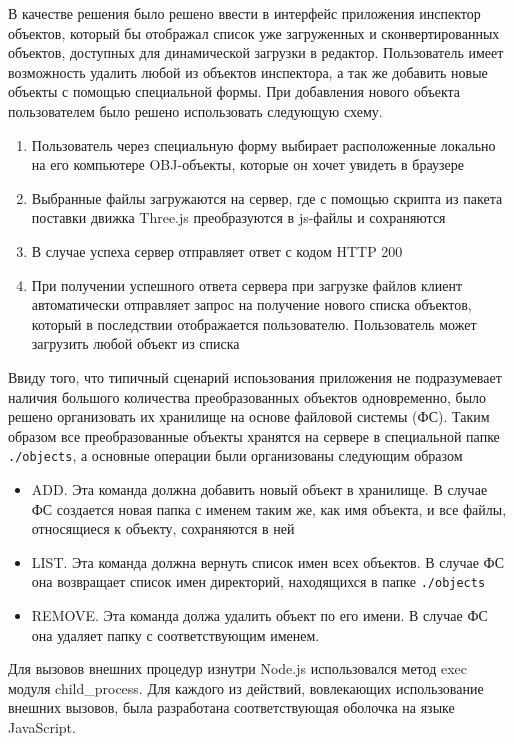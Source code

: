 \documentclass[12pt, a4paper]{article}
\begin{document}
В качестве решения было решено ввести в интерфейс приложения инспектор объектов,
который бы отображал список уже загруженных и сконвертированных объектов,
доступных для динамической загрузки в редактор. Пользователь имеет возможность
удалить любой из объектов инспектора, а так же добавить новые объекты с помощью
специальной формы. При добавления нового объекта пользователем было решено
использовать следующую схему.
\begin{enumerate}
    \item Пользователь через специальную форму выбирает расположенные локально
    на его компьютере OBJ-объекты, которые он хочет увидеть в браузере
    \item Выбранные файлы загружаются на сервер, где с помощью скрипта из
    пакета поставки движка Three.js преобразуются в js-файлы и сохраняются
    \item В случае успеха сервер отправляет ответ с кодом HTTP 200
    \item При получении успешного ответа сервера при загрузке файлов клиент
    автоматически отправляет запрос на получение нового списка объектов, который
    в последствии отображается пользователю. Пользователь может загрузить любой
    объект из списка
\end{enumerate}

Ввиду того, что типичный сценарий испоьзования приложения не подразумевает
наличия большого количества преобразованных объектов одновременно, было решено
организовать их хранилище на основе файловой системы (ФС). Таким образом все
преобразованные объекты хранятся на сервере в специальной папке
\texttt{./objects}, а основные операции были организованы следующим
образом
\begin{itemize}
    \item ADD. Эта команда должна добавить новый объект в хранилище. В
    случае ФС создается новая папка с именем таким же, как имя объекта, и все
    файлы, относящиеся к объекту, сохраняются в ней
    \item LIST. Эта команда должна вернуть список имен всех объектов. В
    случае ФС она возвращает список имен директорий, находящихся в папке
    \texttt{./objects}
    \item REMOVE. Эта команда должа удалить объект по его имени. В случае
    ФС она удаляет папку с соответствующим именем.
\end{itemize}

Для вызовов внешних процедур изнутри Node.js использовался метод exec модуля
child\_process. Для каждого из действий, вовлекающих использование внешних
вызовов, была разработана соответствующая оболочка на языке JavaScript.
\end{document}
